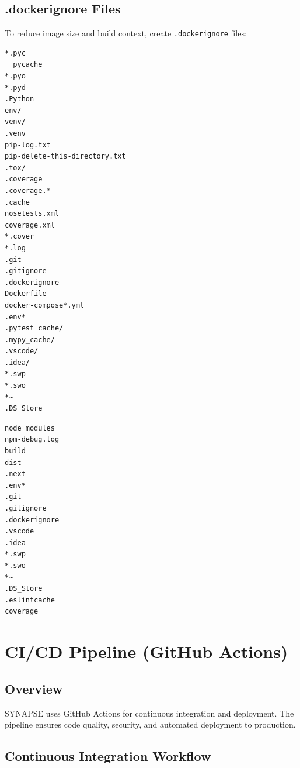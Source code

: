 \documentclass{report}
\begin{document}
\section{.dockerignore Files}

To reduce image size and build context, create \texttt{.dockerignore} files:

\begin{lstlisting}[caption=.dockerignore - Backend]
*.pyc
__pycache__
*.pyo
*.pyd
.Python
env/
venv/
.venv
pip-log.txt
pip-delete-this-directory.txt
.tox/
.coverage
.coverage.*
.cache
nosetests.xml
coverage.xml
*.cover
*.log
.git
.gitignore
.dockerignore
Dockerfile
docker-compose*.yml
.env*
.pytest_cache/
.mypy_cache/
.vscode/
.idea/
*.swp
*.swo
*~
.DS_Store
\end{lstlisting}

\begin{lstlisting}[caption=.dockerignore - Frontend]
node_modules
npm-debug.log
build
dist
.next
.env*
.git
.gitignore
.dockerignore
.vscode
.idea
*.swp
*.swo
*~
.DS_Store
.eslintcache
coverage
\end{lstlisting}

\chapter{CI/CD Pipeline (GitHub Actions)}

\section{Overview}

SYNAPSE uses GitHub Actions for continuous integration and deployment. The pipeline ensures code quality, security, and automated deployment to production.

\section{Continuous Integration Workflow}
\end{document}
